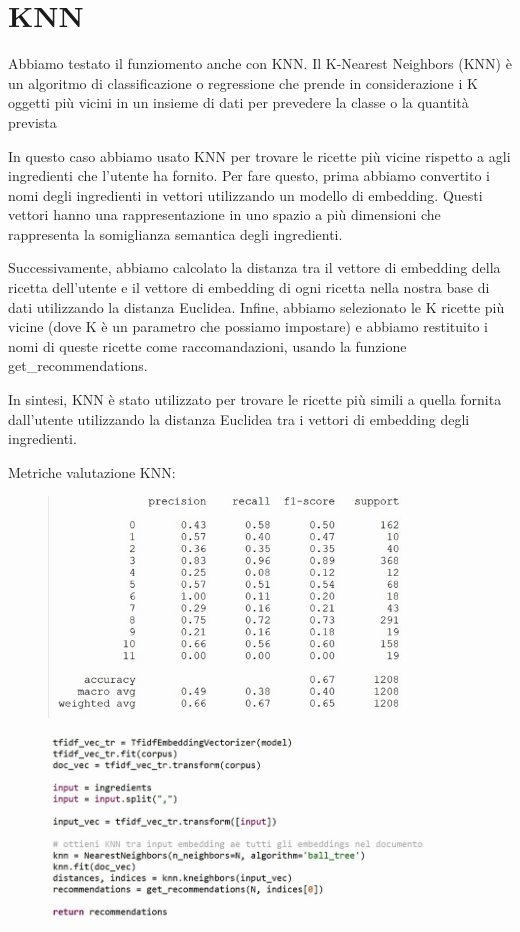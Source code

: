 \documentclass[12pt]{report}
\begin{document}
\section{KNN}

Abbiamo testato il funziomento anche con  KNN.
Il K-Nearest Neighbors (KNN) è un algoritmo di classificazione o regressione che prende in considerazione i K oggetti più vicini in un insieme di dati per prevedere la classe o la quantità prevista

In questo caso abbiamo usato KNN per trovare le ricette più vicine rispetto a agli ingredienti che l'utente ha fornito. Per fare questo, prima abbiamo convertito i nomi degli ingredienti in vettori utilizzando un modello di embedding. Questi vettori hanno una rappresentazione in uno spazio a più dimensioni che rappresenta la somiglianza semantica degli ingredienti.

Successivamente, abbiamo calcolato la distanza tra il vettore di embedding della ricetta dell'utente e il vettore di embedding di ogni ricetta nella nostra base di dati utilizzando la distanza Euclidea. Infine, abbiamo selezionato le K ricette più vicine (dove K è un parametro che possiamo impostare) e abbiamo restituito i nomi di queste ricette come raccomandazioni, usando la funzione get\_recommendations.

In sintesi, KNN è stato utilizzato per trovare le ricette più simili a quella fornita dall'utente utilizzando la distanza Euclidea tra i vettori di embedding degli ingredienti.

Metriche valutazione KNN:

\begin{figure}[H]
        \centering
        {\includegraphics[width=0.9\textwidth]{img/img21.jpg}}
\end{figure}

\begin{figure}[H]
        \centering
        {\includegraphics[width=0.9\textwidth]{img/img17.jpg}}
\end{figure}
\end{document}
